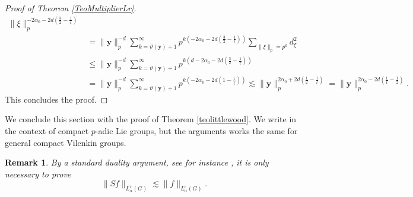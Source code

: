 \documentclass[12pt, reqno]{amsart}
\newtheorem{rem}[defi]{Remark}
\newcommand{\1}{\mathds{1}}
\begin{document}
\begin{proof}[Proof of Theorem \ref{TeoMultiplierLr}]
\begin{align*}
\|\xi \|_p^{-2\alpha_0-2d(
    \frac{3}{2}-\frac{1}{t})} \\ &= \|\mathbf{y}\|_p^{-d}  \sum_{k= \vartheta(\mathbf{y})+1}^{\infty}  p^{k(-2\alpha_0-2d(
    \frac{3}{2}-\frac{1}{t}))} \sum_{\| \xi \|_p = p^k} 
    d_\xi^2 \\ & \leq \|\mathbf{y}\|_p^{-d}  \sum_{k= \vartheta(\mathbf{y})+1}^{\infty}  p^{k(d -2\alpha_0-2d(
    \frac{3}{2}-\frac{1}{t}))} \\ & = \|\mathbf{y}\|_p^{-d}  \sum_{k= \vartheta(\mathbf{y})+1}^{\infty}  p^{k(-2\alpha_0-2d(
    1-\frac{1}{t}))} \lesssim  \|\mathbf{y}\|_p^{2 \alpha_0 +2d(\frac{1}{2}-\frac{1}{t})}  = \|\mathbf{y}\|_p^{2 \alpha_0 -2d(\frac{1}{t} - \frac{1}{2})} .
\end{align*}
This concludes the proof.\end{proof} 



We conclude this section with the proof of Theorem \ref{teolittlewood}. We write in the context of compact $p$-adic Lie groups, but the arguments works the same for general compact Vilenkin groups.

\begin{rem}
By a standard duality argument, see for instance \cite[p.p.\ 105, 5.3.1]{Stein1971}, it is only 
necessary to prove
\[
\|Sf\|_{L^r_{\alpha}(G)} \lesssim \|f\|_{L^r_{\alpha}(G)}.
\]
\end{rem}
\end{document}
